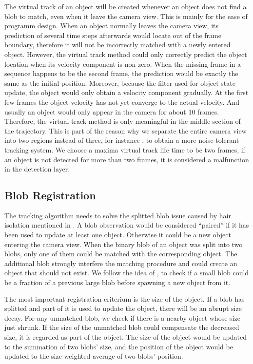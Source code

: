 The virtual track of an object will be created whenever an object does not find a blob to match, even when it leave the camera view. This is mainly for the ease of programm design. When an object normally leaves the camera view, its prediction of several time steps afterwards would locate out of the frame boundary, therefore it will not be incorrectly matched with a newly entered object. However, the virtual track method could only correctly predict the object location when its velocity component is non-zero. When the missing frame in a sequence happens to be the second frame, the prediction would be exactly the same as the initial position. Moreover, because the filter used for object state update, the object would only obtain a velocity component gradually. At the first few frames the object velocity has not yet converge to the actual velocity. And usually an object would only appear in the camera for about 10 frames. Therefore, the virtual track method is only meaningful in the middle section of the trajectory. This is part of the reason why we separate the entire camera view into two regions instead of three, for instance \cite{mika}, to obtain a more noise-tolerant tracking system. We choose a maxima virtual track life time to be two frames, if an object is not detected for more than two frames, it is considered a malfunction in the detection layer.

\subsection{Blob Registration}
The tracking algorithm needs to solve the splitted blob issue caused by hair isolation mentioned in . A blob observation would be considered ``paired'' if it has been used to update at least one object. Otherwise it could be a new object entering the camera view. When the binary blob of an object was split into two blobs, only one of them could be matched with the corresponding object. The additional blob strongly interfere the matching procedure and could create an object that should not exist. We follow the idea of \citeauthor{sharma2012blob} \cite{sharma2012blob}, to check if a small blob could be a fraction of a previous large blob before spawning a new object from it.

The most important registration criterium is the size of the object. If a blob has splitted and part of it is used to update the object, there will be an abrupt size decay. For any unmatched blob, we check if there is a nearby object whose size just shrunk. If the size of the unmatched blob could compensate the decreased size, it is regarded as part of the object. The size of the object would be updated to the summation of two blobs' size, and the position of the object would be updated to the size-weighted average of two blobs' position.
